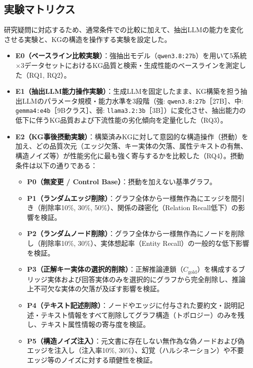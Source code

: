 \documentclass[a4j,dvipdfmx]{jsarticle}
\begin{document}
\subsection{実験マトリクス}
研究疑問に対応するため、通常条件での比較に加えて、抽出LLMの能力を変化させる実験と、KGの構造を操作する実験を設定した。
\begin{itemize}
    \item \textbf{E0（ベースライン比較実験）}：強抽出モデル（\texttt{qwen3.8:27b}）を用いて5系統×3データセットにおけるKG品質と検索・生成性能のベースラインを測定した（RQ1, RQ2）。
    \item \textbf{E1（抽出LLM能力操作実験）}：生成LLMを固定したまま、KG構築を担う抽出LLMのパラメータ規模・能力水準を3段階（強: \texttt{qwen3.8:27b}［27B］、中: \texttt{gemma4:e4b}［9Bクラス］、弱: \texttt{llama3.2:3b}［3B］）に変化させ、抽出能力の低下に伴うKG品質および下流性能の劣化傾向を定量化した（RQ3）。
    \item \textbf{E2（KG事後摂動実験）}：構築済みKGに対して意図的な構造操作（摂動）を加え、どの品質次元（エッジ欠落、キー実体の欠落、属性テキストの有無、構造ノイズ等）が性能劣化に最も強く寄与するかを比較した（RQ4）。摂動条件は以下の通りである：
    \begin{itemize}
        \item \textbf{P0（無変更 / Control Base）}：摂動を加えない基準グラフ。
        \item \textbf{P1（ランダムエッジ削除）}：グラフ全体から一様無作為にエッジを間引き（削除率10\%, 30\%, 50\%）、関係の疎密化（Relation Recall低下）の影響を検証。
        \item \textbf{P2（ランダムノード削除）}：グラフ全体から一様無作為にノードを削除し（削除率10\%, 30\%）、実体想起率（Entity Recall）の一般的な低下影響を検証。
        \item \textbf{P3（正解キー実体の選択的削除）}：正解推論連鎖（$C_{\text{gold}}$）を構成するブリッジ実体および回答実体のみを選択的にグラフから完全削除し、推論上不可欠な実体の欠落が及ぼす影響を検証。
        \item \textbf{P4（テキスト記述削除）}：ノードやエッジに付与された要約文・説明記述・テキスト情報をすべて削除してグラフ構造（トポロジー）のみを残し、テキスト属性情報の寄与度を検証。
        \item \textbf{P5（構造ノイズ注入）}：元文書に存在しない無作為な偽ノードおよび偽エッジを注入し（注入率10\%, 30\%）、幻覚（ハルシネーション）や不要エッジ等のノイズに対する頑健性を検証。
    \end{itemize}
\end{itemize}
\end{document}
